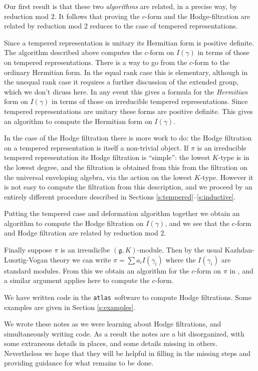 \documentclass[12pt,leqno]{article}
\newcommand{\g}{\mathfrak g}
\newcommand{\atlas}{{\tt atlas~}}
\begin{document}
Our first result is that these two {\it algorithms} are related, in a
precise way, by reduction mod $2$. It follows that proving  the $c$-form and
the Hodge-filtration are related by reduction mod $2$ reduces to the
case of tempered representations.

Since a tempered representation is unitary its Hermitian form is
positive definite. The algorithm described above computes the
$c$-form on $I(\gamma)$ in terms of those on tempered
representations. There is a way to go from the $c$-form to the
ordinary Hermitian form. In the equal rank case this is elementary,
although in the unequal rank case it requires a further discussion of
the extended group, which we don't dicuss here. In any event this
gives a formula for the {\it Hermitian} form on $I(\gamma)$ in terms
of those on irreducible tempered representations. Since tempered
representations are unitary these forms are positive definite. This
gives an algorithm to compute the Hermitian form on $I(\gamma)$.

In the case of the Hodge filtration there is more work to do: the
Hodge filtration on a tempered representation is itself a non-trivial
object. If $\pi$ is an irreducible tempered representation its Hodge
filtration is ``simple'': the lowest $K$-type is in the lowest degree,
and the filtration is obtained from this from  the filtration on the
universal enveloping algebra, via the action on the lowest $K$-type.
However it is not easy to compute the filtration from this
description, and we proceed by an entirely different procedure
described in Sections \ref{s:tempered}--\ref{s:inductive}.

Putting the tempered case and deformation algorithm together we obtain
an algorithm to compute the Hodge filtration on $I(\gamma)$, and we
see that the $c$-form and Hodge filtration are related by reduction
mod $2$.

Finally suppose $\pi$ is an irreudiclbe $(\g,K)$-module. Then by the
usual Kazhdan-Lusztig-Vogan theory we can write
$\pi=\sum a_i I(\gamma_i)$ where the $I(\gamma_i)$ are standard
modules. From this we obtain an algorithm for the $c$-form on $\pi$ in
\cite{unitaryDual}, and a similar argument applies here to compute the
$c$-form.

We have written code in the \atlas software to compute Hodge
filtrations. Some examples are given in Section \ref{s:examples}.

We wrote these notes as we were learning about Hodge filtrations, and
simultaneously writing code. As a result the notes are a bit
disorganized, with some extraneous details in places, and some details
missing in others. Nevertheless we hope that they will be helpful in
filling in the missing steps and providing guidance for what
remains to be done.
\end{document}
